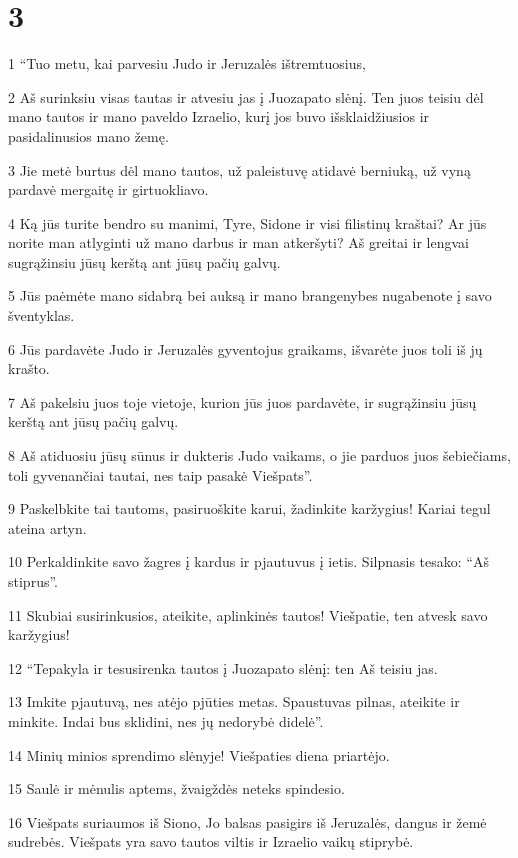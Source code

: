 \chapter{3}


\par 1 “Tuo metu, kai parvesiu Judo ir Jeruzalės ištremtuosius, 
\par 2 Aš surinksiu visas tautas ir atvesiu jas į Juozapato slėnį. Ten juos teisiu dėl mano tautos ir mano paveldo Izraelio, kurį jos buvo išsklaidžiusios ir pasidalinusios mano žemę. 
\par 3 Jie metė burtus dėl mano tautos, už paleistuvę atidavė berniuką, už vyną pardavė mergaitę ir girtuokliavo. 
\par 4 Ką jūs turite bendro su manimi, Tyre, Sidone ir visi filistinų kraštai? Ar jūs norite man atlyginti už mano darbus ir man atkeršyti? Aš greitai ir lengvai sugrąžinsiu jūsų kerštą ant jūsų pačių galvų. 
\par 5 Jūs paėmėte mano sidabrą bei auksą ir mano brangenybes nugabenote į savo šventyklas. 
\par 6 Jūs pardavėte Judo ir Jeruzalės gyventojus graikams, išvarėte juos toli iš jų krašto. 
\par 7 Aš pakelsiu juos toje vietoje, kurion jūs juos pardavėte, ir sugrąžinsiu jūsų kerštą ant jūsų pačių galvų. 
\par 8 Aš atiduosiu jūsų sūnus ir dukteris Judo vaikams, o jie parduos juos šebiečiams, toli gyvenančiai tautai, nes taip pasakė Viešpats”. 
\par 9 Paskelbkite tai tautoms, pasiruoškite karui, žadinkite karžygius! Kariai tegul ateina artyn. 
\par 10 Perkaldinkite savo žagres į kardus ir pjautuvus į ietis. Silpnasis tesako: “Aš stiprus”. 
\par 11 Skubiai susirinkusios, ateikite, aplinkinės tautos! Viešpatie, ten atvesk savo karžygius! 
\par 12 “Tepakyla ir tesusirenka tautos į Juozapato slėnį: ten Aš teisiu jas. 
\par 13 Imkite pjautuvą, nes atėjo pjūties metas. Spaustuvas pilnas, ateikite ir minkite. Indai bus sklidini, nes jų nedorybė didelė”. 
\par 14 Minių minios sprendimo slėnyje! Viešpaties diena priartėjo. 
\par 15 Saulė ir mėnulis aptems, žvaigždės neteks spindesio. 
\par 16 Viešpats suriaumos iš Siono, Jo balsas pasigirs iš Jeruzalės, dangus ir žemė sudrebės. Viešpats yra savo tautos viltis ir Izraelio vaikų stiprybė. 
